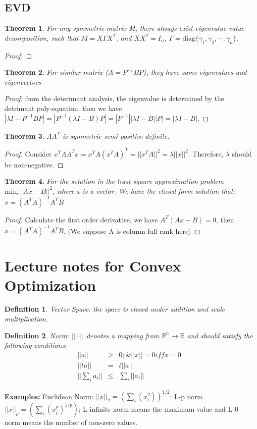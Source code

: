 \documentclass[12pt]{article}
\newtheorem{theorem}{Theorem}
\newtheorem{definition}{Definition}
\begin{document}
\subsection{EVD}
\begin{theorem}
	For any symmetric matrix M, there always exist eigenvalue value decomposition, such that $M=X\Gamma X^T$, and $XX^T=I_n$, $\Gamma=\text{diag}\{\gamma_1, \gamma_2,\cdots,\gamma_n\}$.
\end{theorem}
\begin{proof}
	
\end{proof}
\begin{theorem}
	For similar matrix ($A=P^{-1}BP$), they have same eigenvalues and eigenvectors
\end{theorem}
\begin{proof}
	from the deterimant analysis, the eigenvalue is determined by the detrimant poly-equation. then we have $|\lambda I - P^{-1}BP|=|P^{-1}(\lambda I-B)P|=|P^{-1}||\lambda I - B||P|=|\lambda I - B|.$
\end{proof}
\begin{theorem}
	$AA^T$ is symmetric semi positive definite.
\end{theorem}
\begin{proof}
	Consider $x^TAA^Tx=x^TA(x^TA)^T=||x^TA||^2=\lambda||x||^2.$ Therefore, $\lambda$ should be non-negative.
\end{proof}
\begin{theorem}
	For the solution in the least square approximation problem $\text{min}_x||Ax-B||^2$, where x is a vector. We have the closed form solution that: $x={(A^TA)}^{-1}A^TB$
\end{theorem}
\begin{proof}
	Calculate the first order derivative, we have $A^T(Ax-B)=0$, then $x={(A^TA)}^{-1}A^TB$. (We suppose A is column full rank here)
\end{proof}


\section{Lecture notes for Convex Optimization}
\begin{definition}
	Vector Space: the space is closed under addition and scale multiplication.
\end{definition}
\begin{definition}
	Norm: $||\cdot||$ denotes a mapping from $\mathbb{R}^n\to \mathbb{R}$ and should satisfy the following conditions:
	\begin{eqnarray}
		||a||&\ge& 0; \& ||x||=0 iff x=0 \\
		||ta|| &=& t||a||\\
		||\sum_i a_i|| &\le& \sum_i ||a_i||
	\end{eqnarray}
\end{definition}
{\bf Examples:} Euclidean Norm: $||x||_2 = (\sum_i(x_i^2))^{1/2}$; L-p norm $||x||_p=(\sum_i(x_i^p)^{1/p})$; L-infinite norm means the maximum value and L-0 norm means the number of non-zero values.
\end{document}
